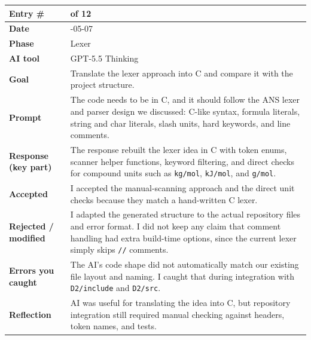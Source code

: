 \documentclass[11pt,a4paper]{article}
\newcommand{\code}[1]{\texttt{#1}}
\newcommand{\entrygap}{\vspace{8pt}}
\newenvironment{journalentry}{%
  \begin{center}\small\renewcommand{\arraystretch}{1.22}%
  \begin{tabular}{|>{\columncolor{anscodebg}\bfseries}p{3.0cm}|>{\RaggedRight\arraybackslash}p{12.25cm}|}%
  \hline
}{%
  \end{tabular}\end{center}\entrygap
}
\begin{document}
\begin{journalentry}
Entry \# & 10 of 12 \\ \hline
Date & 2026-05-07 \\ \hline
Phase & Lexer \\ \hline
AI tool & GPT-5.5 Thinking \\ \hline
Goal & Translate the lexer approach into C and compare it with the project structure. \\ \hline
Prompt & The code needs to be in C, and it should follow the ANS lexer and parser design we discussed: C-like syntax, formula literals, string and char literals, slash units, hard keywords, and line comments. \\ \hline
Response (key part) & The response rebuilt the lexer idea in C with token enums, scanner helper functions, keyword filtering, and direct checks for compound units such as \code{kg/mol}, \code{kJ/mol}, and \code{g/mol}. \\ \hline
Accepted & I accepted the manual-scanning approach and the direct unit checks because they match a hand-written C lexer. \\ \hline
Rejected / modified & I adapted the generated structure to the actual repository files and error format. I did not keep any claim that comment handling had extra build-time options, since the current lexer simply skips \code{//} comments. \\ \hline
Errors you caught & The AI's code shape did not automatically match our existing file layout and naming. I caught that during integration with \code{D2/include} and \code{D2/src}. \\ \hline
Reflection & AI was useful for translating the idea into C, but repository integration still required manual checking against headers, token names, and tests. \\ \hline
\end{journalentry}
\end{document}
